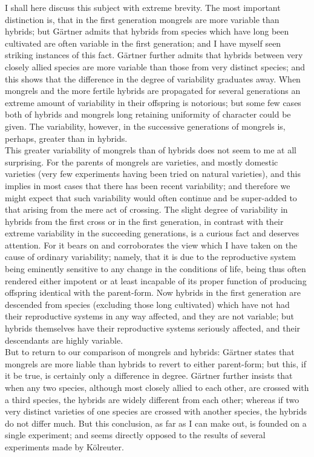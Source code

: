 \indent I shall here discuss this subject with extreme brevity. The most important distinction is, that in the first generation mongrels are more variable than hybrids; but G\"{a}rtner admits that hybrids from species which have long been cultivated are often variable in the first generation; and I have myself seen striking instances of this fact. G\"{a}rtner further admits that hybrids between very closely allied species are more variable than those from very distinct species; and this shows that the difference in the degree of variability graduates away. When mongrels and the more fertile hybrids are propagated for several generations an extreme amount of variability in their offspring is notorious; but some few cases both of hybrids and mongrels long retaining uniformity of character could be given. The variability, however, in the successive generations of mongrels is, perhaps, greater than in hybrids.\\
\indent This greater variability of mongrels than of hybrids does not seem to me at all surprising. For the parents of mongrels are varieties, and mostly domestic varieties (very few experiments having been tried on natural varieties), and this implies in most cases that there has been recent variability; and therefore we might expect that such variability would often continue and be super-added to that arising from the mere act of crossing. The slight degree of variability in hybrids from the first cross or in the first generation, in contrast with their extreme variability in the succeeding generations, is a curious fact and deserves attention. For it bears on and corroborates the view which I have taken on the cause of ordinary variability; namely, that it is due to the reproductive system being eminently sensitive to any change in the conditions of life, being thus often rendered either impotent or at least incapable of its proper function of producing offspring identical with the parent-form. Now hybrids in the first generation are descended from species (excluding those long cultivated) which have not had their reproductive systems in any way affected, and they are not variable; but hybrids themselves have their reproductive systems seriously affected, and their descendants are highly variable.\\
\indent But to return to our comparison of mongrels and hybrids: G\"{a}rtner states that mongrels are more liable than hybrids to revert to either parent-form; but this, if it be true, is certainly only a difference in degree. G\"{a}rtner further insists that when any two species, although most closely allied to each other, are crossed with a third species, the hybrids are widely different from each other; whereas if two very distinct varieties of one species are crossed with another species, the hybrids do not differ much. But this conclusion, as far as I can make out, is founded on a single experiment; and seems directly opposed to the results of several experiments made by K\"{o}lreuter.\\
